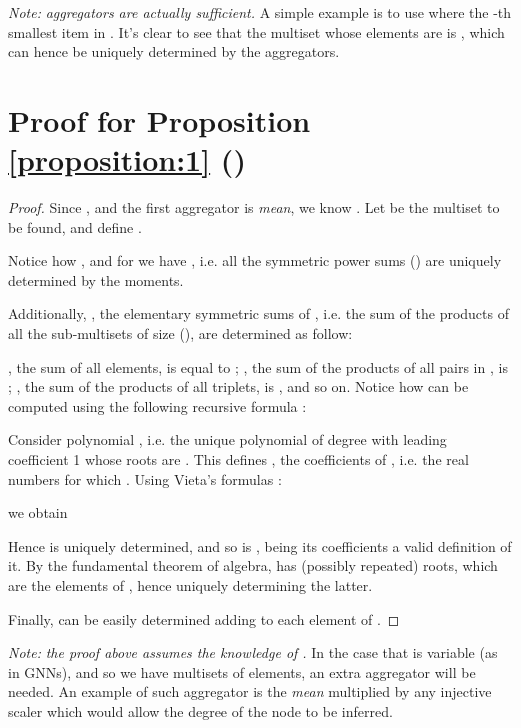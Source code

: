 \documentclass{article}
\begin{document}
\textit{Note:} \textit{ aggregators are actually sufficient.}
A simple example is to use  where  the -th smallest item in . It's clear to see that the multiset whose elements are  is , which can hence be uniquely determined by the aggregators.

\section{Proof for Proposition \ref{proposition:1} ()}
\label{app:proof_prop1}

\begin{proof}
Since , and the first aggregator is \textit{mean}, we know .
Let  be the multiset to be found, and define .



Notice how , and for  we have , i.e. all the symmetric power sums  () are uniquely determined by the moments.

Additionally, , the elementary symmetric sums of , i.e. the sum of the products of all the sub-multisets of size  (), are determined as follow: 

, the sum of all elements, is equal to ;  ,  the sum of the products of all pairs in , is ; , the sum of the products of all triplets, is , and so on. Notice how  can be computed using the following recursive formula \cite{newton}:


Consider polynomial , i.e. the unique polynomial of degree  with leading coefficient 1  whose roots are . This defines , the coefficients of , i.e. the real numbers  for which  .
Using Vieta's formulas \cite{vieta}:

we obtain


Hence  is uniquely determined, and so is , being its coefficients a valid definition of it.
By the fundamental theorem of algebra,  has  (possibly repeated) roots, which are the elements of , hence uniquely determining the latter.

Finally,  can be easily determined adding  to each element of .
\end{proof}
\textit{Note:} \textit{the proof above assumes the knowledge of .}
In the case that  is variable (as in GNNs), and so we have multisets of \underline{}  elements, an extra aggregator will be needed. An example of such aggregator is the \textit{mean} multiplied by any injective scaler which would allow the degree of the node to be inferred.
\end{document}
